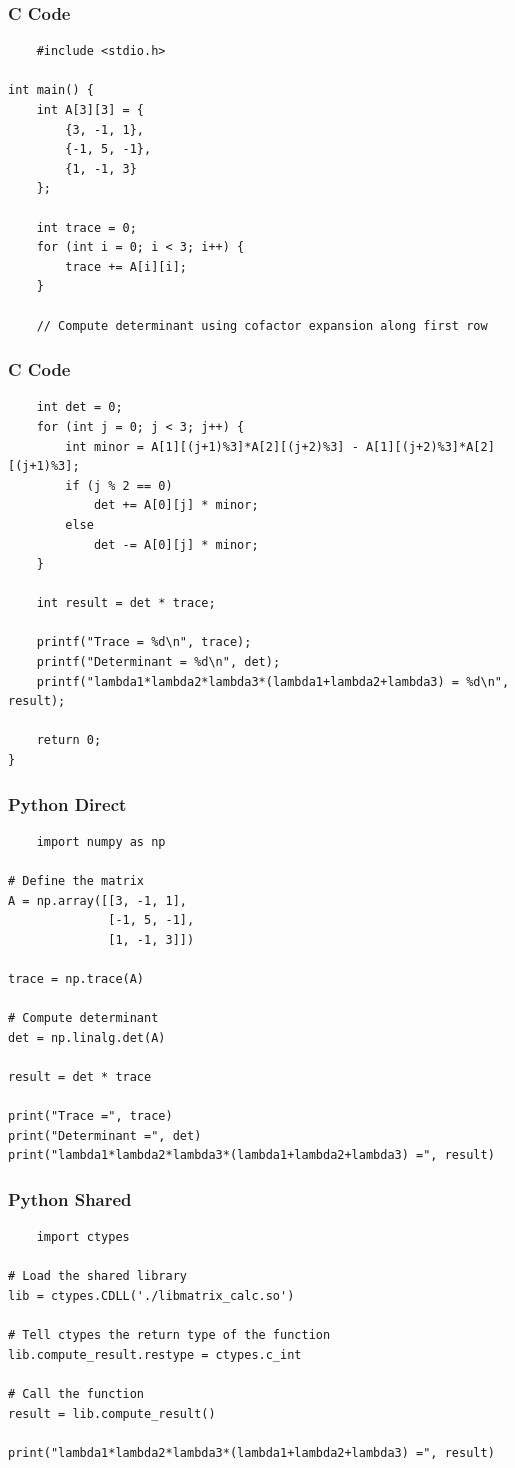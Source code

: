 \documentclass{beamer}
\begin{document}
\begin{frame}[fragile]
\frametitle{C Code}
\begin{lstlisting}
    #include <stdio.h>

int main() {
    int A[3][3] = {
        {3, -1, 1},
        {-1, 5, -1},
        {1, -1, 3}
    };

    int trace = 0;
    for (int i = 0; i < 3; i++) {
        trace += A[i][i];
    }

    // Compute determinant using cofactor expansion along first row
    \end{lstlisting}
    \end{frame}
\begin{frame}[fragile]
\frametitle{C Code}
\begin{lstlisting}
    int det = 0;
    for (int j = 0; j < 3; j++) {
        int minor = A[1][(j+1)%3]*A[2][(j+2)%3] - A[1][(j+2)%3]*A[2][(j+1)%3];
        if (j % 2 == 0)
            det += A[0][j] * minor;
        else
            det -= A[0][j] * minor;
    }

    int result = det * trace;

    printf("Trace = %d\n", trace);
    printf("Determinant = %d\n", det);
    printf("lambda1*lambda2*lambda3*(lambda1+lambda2+lambda3) = %d\n", result);

    return 0;
}
\end{lstlisting}
\end{frame}
\begin{frame}[fragile]
\frametitle{Python Direct}
\begin{lstlisting}
    import numpy as np

# Define the matrix
A = np.array([[3, -1, 1],
              [-1, 5, -1],
              [1, -1, 3]])

trace = np.trace(A)

# Compute determinant
det = np.linalg.det(A)

result = det * trace

print("Trace =", trace)
print("Determinant =", det)
print("lambda1*lambda2*lambda3*(lambda1+lambda2+lambda3) =", result)
\end{lstlisting}
\end{frame}
\begin{frame}[fragile]
\frametitle{Python Shared}
\begin{lstlisting}
    import ctypes

# Load the shared library
lib = ctypes.CDLL('./libmatrix_calc.so')

# Tell ctypes the return type of the function
lib.compute_result.restype = ctypes.c_int

# Call the function
result = lib.compute_result()

print("lambda1*lambda2*lambda3*(lambda1+lambda2+lambda3) =", result)
\end{lstlisting}
\end{frame}
\end{document}
